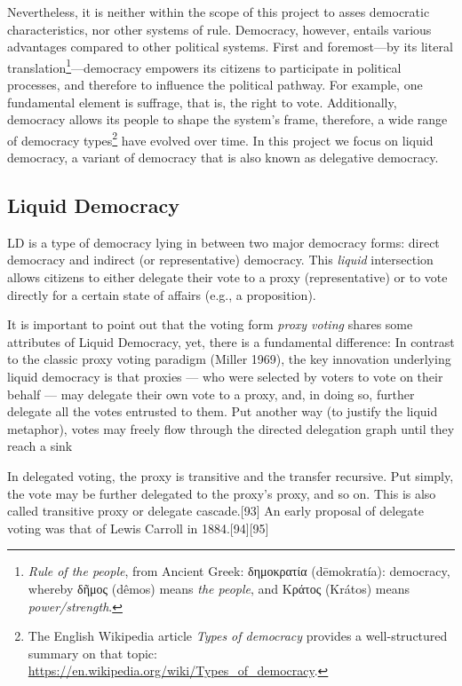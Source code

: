 Nevertheless, it is neither within the scope of this project to asses democratic characteristics, nor other systems of rule. Democracy, however, entails various advantages compared to other political systems. First and foremost---by its literal translation\footnote{\textit{Rule of the people}, from Ancient Greek: \textgreek{δημοκρατία} (dēmokratía): democracy, whereby \textgreek{δῆμος} (dêmos) means \textit{the people}, and \textgreek{Κράτος} (Krátos) means \textit{power/strength}.}---democracy empowers its citizens to participate in political processes, and therefore to influence the political pathway. For example, one fundamental element is suffrage, that is, the right to vote. Additionally, democracy allows its people to shape the system’s frame, therefore, a wide range of democracy types\footnote{The English Wikipedia article \textit{Types of democracy} provides a well-structured summary on that topic: \url{https://en.wikipedia.org/wiki/Types_of_democracy}.} have evolved over time. In this project we focus on liquid democracy, a variant of democracy that is also known as delegative democracy.


\subsection{Liquid Democracy}
\label{ssec:Liquid_Democracy}

\acrfull{LD} is a type of democracy lying in between two major democracy forms: direct democracy and indirect (or representative) democracy. This \textit{liquid} intersection allows citizens to either delegate their vote to a proxy (representative) or to vote directly for a certain state of affairs (e.g., a proposition).

It is important to point out that the voting form \textit{proxy voting} shares some attributes of Liquid Democracy, yet, there is a fundamental difference: In contrast to the classic proxy voting paradigm (Miller 1969), the key innovation underlying liquid democracy is that proxies — who were selected by voters to vote on their behalf — may delegate their own vote to a proxy, and, in doing so, further delegate all the votes entrusted to them. Put another way (to justify the liquid metaphor), votes may freely flow through the directed delegation graph until they reach a sink \parencite{Kahng2018}

In delegated voting, the proxy is transitive and the transfer recursive. Put simply, the vote may be further delegated to the proxy's proxy, and so on. This is also called transitive proxy or delegate cascade.[93] An early proposal of delegate voting was that of Lewis Carroll in 1884.[94][95]



